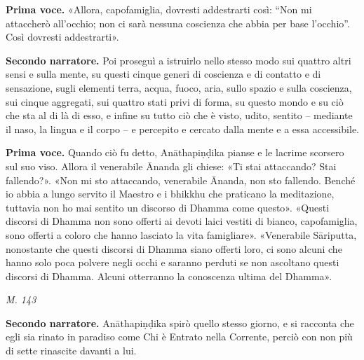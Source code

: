 \textbf{Prima voce.} «Allora, capofamiglia, dovresti addestrarti così: “Non mi
attaccherò all’occhio; non ci sarà nessuna coscienza che abbia per base
l’occhio”. Così dovresti addestrarti».


\textbf{Secondo narratore.} Poi proseguì a istruirlo nello stesso modo sui
quattro altri sensi e sulla mente, su questi cinque generi di coscienza
e di contatto e di sensazione, sugli elementi terra, acqua, fuoco, aria,
sullo spazio e sulla coscienza, sui cinque aggregati, sui quattro stati
privi di forma, su questo mondo e su ciò che sta al di là di esso, e
infine su tutto ciò che è visto, udito, sentito – mediante il naso, la
lingua e il corpo – e percepito e cercato dalla mente e a essa
accessibile.


\textbf{Prima voce.} Quando ciò fu detto, Anāthapiṇḍika pianse e le lacrime
scorsero sul suo viso. Allora il venerabile Ānanda gli chiese: «Ti stai
attaccando? Stai fallendo?». «Non mi sto attaccando, venerabile Ānanda,
non sto fallendo. Benché io abbia a lungo servito il Maestro e i bhikkhu
che praticano la meditazione, tuttavia non ho mai sentito un discorso di
Dhamma come questo». «Questi discorsi di Dhamma non sono offerti ai
devoti laici vestiti di bianco, capofamiglia, sono offerti a coloro che
hanno lasciato la vita famigliare». «Venerabile Sāriputta, nonostante
che questi discorsi di Dhamma siano offerti loro, ci sono alcuni che
hanno solo poca polvere negli occhi e saranno perduti se non ascoltano
questi discorsi di Dhamma. Alcuni otterranno la conoscenza ultima del
Dhamma».


\emph{M. 143}


\textbf{Secondo narratore.} Anāthapiṇḍika spirò quello stesso giorno, e si
racconta che egli sia rinato in paradiso come Chi è Entrato nella
Corrente, perciò con non più di sette rinascite davanti a lui.



